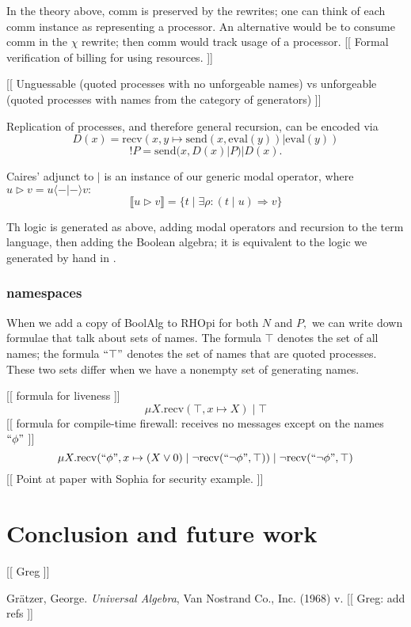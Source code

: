 \documentclass{article}
\newcommand{\interp}[1]{\llbracket #1 \rrbracket}
\newcommand{\maps}{\colon}
\newcommand{\send}{\mathrm{send}}
\newcommand{\recv}{\mathrm{recv}}
\renewcommand{\quote}[1]{``#1"}
\newcommand{\deref}[1]{\mathrm{eval}(#1)}
\begin{document}
In the theory above, comm is preserved by the rewrites; one can think of each comm instance as representing a processor.  An alternative would be to consume comm in the $\chi$ rewrite; then comm would track usage of a processor.  [[ Formal verification of billing for using resources. ]]

[[ Unguessable (quoted processes with no unforgeable names) vs unforgeable (quoted processes with names from the category of generators) ]]

Replication of processes, and therefore general recursion, can be encoded \cite{RHOcalc} via
\[D(x) = \recv(x, y\mapsto \send(x, \deref{y}) | \deref{y})\]
\[!P = \send(x, D(x) | P) | D(x).\]

Caires' adjunct to $|$ is an instance of our generic modal operator, where $u \triangleright v = u \langle - | - \rangle v:$
\[ \interp{u \triangleright v} = \{ t \;|\; \exists \rho\maps (t\;|\;u) \Rightarrow v\} \]

Th logic is generated as above, adding modal operators and recursion to the term language, then adding the Boolean algebra; it is equivalent to the logic we generated by hand in \cite{NamespaceLogic}.

\subsubsection{namespaces}

When we add a copy of BoolAlg to RHOpi for both $N$ and $P,$ we can write down formulae that talk about sets of names.  The formula $\top$ denotes the set of all names; the formula $\quote{\top}$ denotes the set of names that are quoted processes.  These two sets differ when we have a nonempty set of generating names.

[[ formula for liveness ]]
\[ \mu X. \recv(\top, x \mapsto X)\;|\;\top \]
[[ formula for compile-time firewall: receives no messages except on the names $\quote{\phi}$ ]]
\[ \mu X. \recv(\quote{\phi}, x \mapsto (X \lor 0)\;|\;\neg\recv(\quote{\neg \phi}, \top))\;|\;\neg\recv(\quote{\neg \phi}, \top) \]
[[ Point at paper with Sophia for security example. ]]

\section{Conclusion and future work}
[[ Greg ]]

\begin{thebibliography}{99}
 Gr\"atzer, George. {\em Universal Algebra}, Van Nostrand Co., Inc. (1968) v.
[[ Greg: add refs ]]
\end{thebibliography}
\end{document}
